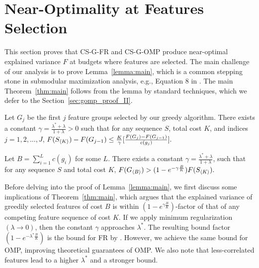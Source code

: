 \section{Near-Optimality at Features Selection}
\label{sec:gomp_proof}

This section proves that CS-G-FR and CS-G-OMP 
produce near-optimal explained variance $F$ at budgets 
where features are selected. The main challenge of our analysis is to prove Lemma~\ref{lemma:main},
which is a common stepping stone in 
submodular maximization analysis, e.g., Equation 8 in \citep{submodular}. The main Theorem~\ref{thm:main} follows from the lemma by standard techniques, which we defer to the Section~\ref{sec:gomp_proof_II}. 

\begin{lemma}[main]
  Let $G_j$ be the first $j$ feature groups selected by our greedy algorithm. There exists a constant $\gamma = \frac{\lambda^* + \lambda}{1 +\lambda} > 0$ such that for any sequence $S$, total cost $K$, and indices $j=1,2,..., J$, 
  \mbox{$
    F(S_{\langle K \rangle}) - F(G_{j-1}) \leq \frac{K}{\gamma}
      \lbrack \frac{F(G_j) - F(G_{j-1})}{c(g_j)} \rbrack.
  $}
  \label{lemma:main}
\end{lemma}


\begin{theorem}
Let $B = \sum _{i=1}^L c(g_i)$ for some $L$.  
There exists a constant  
  $\gamma = \frac{\lambda^* + \lambda}{1+\lambda}$, 
  such that
for any sequence $S$ and total cost $K$, 
\mbox{$
  F(G_{\langle B \rangle}) > (1 - e^{-\gamma\frac{B}{K}})F(S_{\langle K \rangle}).
$}
\label{thm:main}
\end{theorem}

%
Before delving into the proof of Lemma~\ref{lemma:main}, we first discuss 
some implications of Theorem~\ref{thm:main}, which 
argues that the explained variance of greedily selected
features of cost $B$ is within $(1-e^{\gamma \frac{B}{K}})$-factor
of that of any competing feature sequence of cost $K$.
If we apply minimum regularization $(\lambda \rightarrow 0)$, then 
the constant $\gamma$ approaches $\lambda^*$. The resulting bound factor $(1-e^{ - \lambda^* \frac{B}{K}})$ is the bound for FR by \cite{kemp}. However, we achieve the same bound for OMP, improving
theoretical guarantees of OMP. We also note that less-correlated features lead
to a higher $\lambda^*$  and a stronger bound. 



